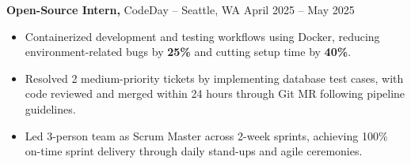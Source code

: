 \documentclass[11pt]{article}
\begin{document}
\textbf{Open-Source Intern,} {CodeDay} -- Seattle, WA \hfill April 2025 -- May 2025
\vspace{-9pt}
\begin{itemize}
  \item Containerized development and testing workflows using Docker, reducing environment-related bugs by \textbf{25\%} and cutting setup time by \textbf{40\%}.
  \item Resolved 2 medium-priority tickets by implementing database test cases, with code reviewed and merged within 24 hours through Git MR following pipeline guidelines.
  \item Led 3-person team as Scrum Master across 2-week sprints, achieving 100\% on-time sprint delivery through daily stand-ups and agile ceremonies.
\end{itemize}

\end{document}

